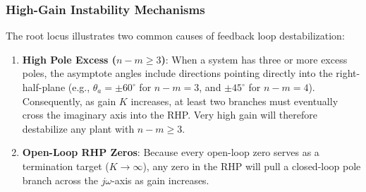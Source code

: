 \documentclass[12pt,onecolumn,twoside ]{article}
\begin{document}
	\subsubsection{High-Gain Instability Mechanisms}
	The root locus illustrates two common causes of feedback loop destabilization:
	\begin{enumerate}
		\item
		\textbf{High Pole Excess ($n - m \ge 3$)}: When a system has three or more excess poles, the asymptote angles include directions pointing directly into the right-half-plane (e.g., $\theta_a = \pm 60^\circ$ for $n - m = 3$, and $\pm 45^\circ$ for $n - m = 4$). Consequently, as gain $K$ increases, at least two branches must eventually cross the imaginary axis into the RHP. Very high gain will therefore destabilize any plant with $n - m \ge 3$.
		\item
		\textbf{Open-Loop RHP Zeros}: Because every open-loop zero serves as a termination target ($K \to \infty$), any zero in the RHP will pull a closed-loop pole branch across the $j\omega$-axis as gain increases.
	\end{enumerate}
	
\end{document}
